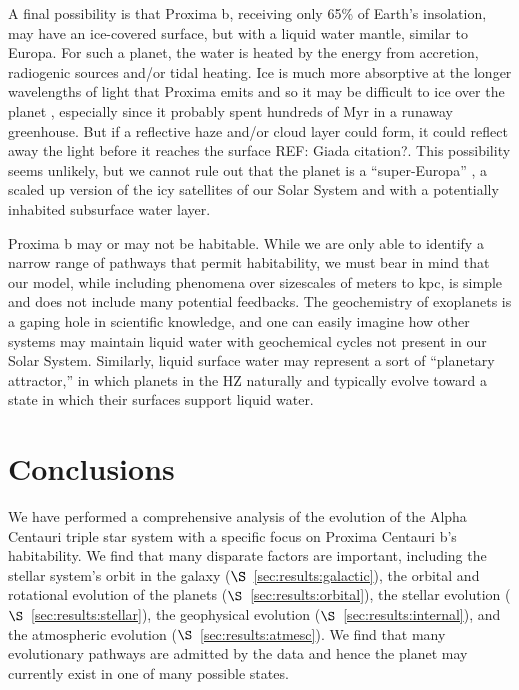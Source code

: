 \documentclass[preprint,12pt]{aastex}
\newcommand{\xxx}[1]{{\color{red} #1}} %
\begin{document}
A final possibility is that Proxima b, receiving only 65\% of Earth's
insolation, may have an ice-covered surface, but with a liquid water
mantle, similar to Europa. For such a planet, the water is heated by
the energy from accretion, radiogenic sources and/or tidal
heating. Ice is much more absorptive at the longer wavelengths of
light that Proxima emits and so it may be difficult to ice over the
planet \xxx{\citep{Joshi12,Shields13}}, especially since it probably spent
hundreds of Myr in a runaway greenhouse. But if a reflective haze
and/or cloud layer could form, it could reflect away the light before
it reaches the surface \xxx{REF: Giada citation?}. This possibility seems unlikely, but we cannot
rule out that the planet is a ``super-Europa'' \citep{BarnesHeller13},
a scaled up version of the icy satellites of our Solar System and with
a potentially inhabited subsurface water layer.

Proxima b may or may not be habitable. While we are only able to
identify a narrow range of pathways that permit habitability, we must
bear in mind that our model, while including phenomena over sizescales
of meters to kpc, is simple and does not include many potential
feedbacks. The geochemistry of exoplanets is a gaping hole in
scientific knowledge, and one can easily imagine how other systems may
maintain liquid water with geochemical cycles not present in our Solar
System. Similarly, liquid surface water may represent a sort of
``planetary attractor,'' in which planets in the HZ naturally and
typically evolve toward a state in which their surfaces support liquid
water. 

\section{Conclusions\label{sec:concl}}
We have performed a comprehensive analysis of the evolution of the
Alpha Centauri triple star system with a specific focus on Proxima Centauri b's
habitability. We find that many disparate factors are important,
including the stellar system's orbit in the galaxy
($\S$~\ref{sec:results:galactic}), the orbital and rotational evolution of
the planets ($\S$~\ref{sec:results:orbital}), the stellar evolution
($\S$~\ref{sec:results:stellar}), the geophysical evolution
($\S$~\ref{sec:results:internal}), and the atmospheric evolution
($\S$~\ref{sec:results:atmesc}). We find that many evolutionary pathways
are admitted by the data and hence the planet may currently exist in
one of many possible states.
\end{document}
